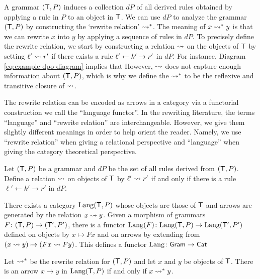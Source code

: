 \documentclass[oneside]{amsart}
\begin{document}
A grammar $( \mathsf{T},P )$ induces a collection $dP$ of
all derived rules obtained by applying a rule in
$P$ to an object in $\mathsf{T}$.  We can use $dP$ to
analyze the grammar $(\mathsf{T},P)$ by constructing the
`rewrite relation' $\rightsquigarrow^\ast$. The meaning
of $x \rightsquigarrow^\ast y$ is that we can rewrite $x$ into
$y$ by applying a sequence of rules in $dP$. To
precisely define the rewrite relation, we start by
constructing a relation $ \rightsquigarrow $ on the
objects of $ \mathsf{T} $ by setting
$ \ell' \rightsquigarrow r' $ if there exists a rule
$ \ell' \leftarrow k' \to r' $ in $ dP $. For instance,
Diagram \eqref{eq:example-dpo-diagram} implies
that  However,
$ \rightsquigarrow $ does not capture enough
information about $( \mathsf{T},P )$, which is why we
define the  $ \rightsquigarrow^\ast $ to
be the reflexive and transitive closure of
$ \rightsquigarrow $.

The rewrite relation can be encoded as arrows in a
category via a functorial construction we call the
``language functor''. In the rewriting literature,
the terms ``language'' and ``rewrite relation''
are interchangeable. However, we give them slightly
different meanings in order to help orient the
reader. Namely, we use ``rewrite relation'' when
giving a relational perspective and ``language''
when giving the category theoretical perspective.

\begin{theorem}
  \label{thm:Lang_from_Gram_to_Cat}
  Let $ (\mathsf{T},P) $ be a grammar and $ dP $ be the
  set of all rules derived from $ ( \mathsf{T},P )
  $. Define a relation $ \rightsquigarrow $ on objects
  of $ \mathsf{T} $ by $ \ell' \rightsquigarrow r' $ if and only
  if there is a rule $ \ell' \gets k' \to r' $ in
  $ dP $.

  There exists a category $ \mathrm{Lang} (\mathsf{T},P) $
  whose objects are those of $ \mathsf{T} $ and arrows are
  generated by the relation $ x \rightsquigarrow y
  $. Given a morphism of grammars
  $ F \colon (\mathsf{T},P) \to (\mathsf{T}',P') $, there is a
  functor
  $ \mathrm{Lang} (F) \colon \mathrm{Lang} (\mathsf{T},P) \to \mathrm{Lang}
  (\mathsf{T}',P') $ defined on objects by
  $ x \mapsto Fx $ and on arrows by extending from
  $ (x \rightsquigarrow y) \mapsto ( Fx \rightsquigarrow Fy )
  $. This defines a functor
  $ \mathrm{Lang} \colon \mathsf{Gram} \to \mathsf{Cat} $
\end{theorem}

\begin{corollary}
  Let $ \rightsquigarrow^\ast $ be the rewrite relation for
  $ ( \mathsf{T},P ) $ and let $ x $ and $ y $ be objects
  of $ \mathsf{T} $. There is an arrow $ x \to y $ in
  $ \mathrm{Lang} (\mathsf{T},P) $ if and only if
  $ x \rightsquigarrow^\ast y $.
\end{corollary}
\end{document}
